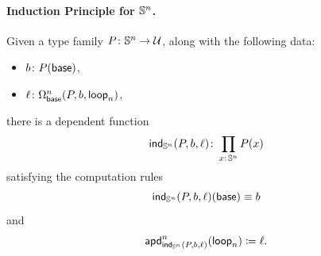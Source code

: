 \paragraph{Induction Principle for $\mathbb S^n$.}
    Given a type family $P\colon\sphere^n\to\univ$, along with the following data:
    \begin{itemize}
        \item $b\colon P(\fun{base})$,
        
        \item $\ell\colon \Omega^n_{\fun{base}}(P, b, \fun{loop}_n)$,
    \end{itemize}
    there is a dependent function
    \[
        \fun{ind}_{\sphere^n}(P,b,\ell)\colon
            \prod_{x\colon\sphere^n}P(x)
    \]
    satisfying the computation rules
    \[
        \mathsf{ind}_{\mathbb S^n}(P,b,\ell)(\mathsf{base})
            \equiv b
    \]
    and
    \[
        \mathsf{apd}^n_{\mathsf{ind}_{\mathbb S^n}(P,b,\ell)}
            (\mathsf{loop}_n)\coloneqq\ell.
    \]

